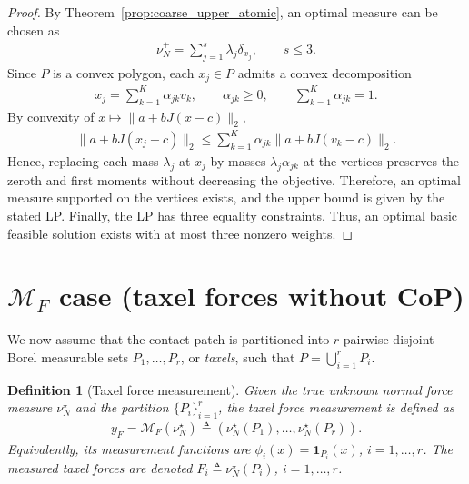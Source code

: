 \documentclass[11pt,a4paper]{article}
\theoremstyle{proposition}
\newtheorem{definition}[theorem]{Definition}
\begin{document}
\begin{proof}
    By Theorem~\ref{prop:coarse_upper_atomic},
    an optimal measure can be chosen as
    \begin{align}
        \nu_N^+=\sum_{j=1}^{s}\lambda_j\delta_{x_j},
        \qquad s\leq3.
    \end{align}
    Since $P$ is a convex polygon, each $x_j\in P$ admits a convex decomposition
    \begin{align}
        x_j=\sum_{k=1}^K\alpha_{jk}v_k,
        \qquad
        \alpha_{jk}\geq0,
        \qquad
        \sum_{k=1}^K\alpha_{jk}=1.
    \end{align}
    By convexity of $x\mapsto\|a+bJ(x-c)\|_2$,
    \begin{align}
        \|a+bJ(x_j-c)\|_2
        \leq
        \sum_{k=1}^K
        \alpha_{jk}\|a+bJ(v_k-c)\|_2.
    \end{align}
    Hence, replacing each mass $\lambda_j$ at $x_j$ by masses $\lambda_j\alpha_{jk}$ at the vertices
    preserves the zeroth and first moments without decreasing the objective.
    Therefore, an optimal measure supported on the vertices exists, and the upper bound is given
    by the stated LP. Finally, the LP has three equality constraints. Thus, an optimal basic feasible solution exists with at most three nonzero weights.
\end{proof}


\section{$\mathcal{M}_F$ case (taxel forces without CoP)}
\label{sec:MF}

We now assume that the contact patch is partitioned into $r$ pairwise disjoint
Borel measurable sets $P_1,\ldots,P_r$, or \textit{taxels}, such that
$P=\bigcup_{i=1}^r P_i$.

\begin{definition}[Taxel force measurement]\label{def:MF}
    Given the true unknown normal force measure $\nu_N^\star$ and the partition $\{P_i\}_{i=1}^r$, the \textit{taxel force measurement} is defined as
    \begin{align}
    y_F = \mathcal M_F(\nu_N^\star) \triangleq
    \left(
    \nu_N^\star(P_1),\ldots,\nu_N^\star(P_r)
    \right).
    \end{align}
    Equivalently, its measurement functions are
    $\phi_i(x)=\mathbf 1_{P_i}(x)$, $i=1,\ldots,r$.
    The measured taxel forces are denoted  $F_i\triangleq\nu_N^\star(P_i)$, $i=1,\ldots,r$.
\end{definition}
\end{document}
